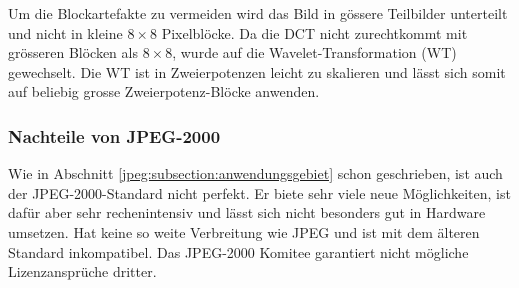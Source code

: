 Um die Blockartefakte zu vermeiden wird das Bild in gössere Teilbilder unterteilt und nicht in kleine \(8\times8\) Pixelblöcke.
Da die DCT nicht zurechtkommt mit grösseren Blöcken als \(8\times8\), wurde auf die Wavelet-Transformation (WT) gewechselt.
Die WT ist in Zweierpotenzen leicht zu skalieren und lässt sich somit auf beliebig grosse Zweierpotenz-Blöcke anwenden.

\subsubsection{Nachteile von JPEG-2000
\label{jpeg:subsubsection:nachteil}}
Wie in Abschnitt \ref{jpeg:subsection:anwendungsgebiet} schon geschrieben, ist auch der JPEG-2000-Standard nicht perfekt.
Er biete sehr viele neue Möglichkeiten, ist dafür aber sehr rechenintensiv und lässt sich nicht besonders gut in Hardware umsetzen.
Hat keine so weite Verbreitung wie JPEG und ist mit dem älteren Standard inkompatibel.
Das JPEG-2000 Komitee garantiert nicht mögliche Lizenzansprüche dritter.
